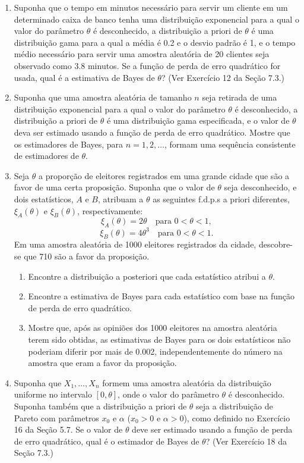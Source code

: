 \begin{enumerate}
    \item Suponha que o tempo em minutos necessário para servir um cliente em um determinado caixa de banco tenha uma distribuição exponencial para a qual o valor do parâmetro $\theta$ é desconhecido, a distribuição a priori de $\theta$ é uma distribuição gama para a qual a média é 0.2 e o desvio padrão é 1, e o tempo médio necessário para servir uma amostra aleatória de 20 clientes seja observado como 3.8 minutos. Se a função de perda de erro quadrático for usada, qual é a estimativa de Bayes de $\theta$? (Ver Exercício 12 da Seção 7.3.)
    
    \item Suponha que uma amostra aleatória de tamanho $n$ seja retirada de uma distribuição exponencial para a qual o valor do parâmetro $\theta$ é desconhecido, a distribuição a priori de $\theta$ é uma distribuição gama especificada, e o valor de $\theta$ deva ser estimado usando a função de perda de erro quadrático. Mostre que os estimadores de Bayes, para $n=1, 2, \dots$, formam uma sequência consistente de estimadores de $\theta$.
    
    \item Seja $\theta$ a proporção de eleitores registrados em uma grande cidade que são a favor de uma certa proposição. Suponha que o valor de $\theta$ seja desconhecido, e dois estatísticos, $A$ e $B$, atribuam a $\theta$ as seguintes f.d.p.s a priori diferentes, $\xi_A(\theta)$ e $\xi_B(\theta)$, respectivamente:
    $$ \xi_A(\theta) = 2\theta \quad \text{para } 0 < \theta < 1, $$
    $$ \xi_B(\theta) = 4\theta^3 \quad \text{para } 0 < \theta < 1. $$
    Em uma amostra aleatória de 1000 eleitores registrados da cidade, descobre-se que 710 são a favor da proposição.
    \begin{enumerate}[label=(\alph*)]
        \item Encontre a distribuição a posteriori que cada estatístico atribui a $\theta$.
        \item Encontre a estimativa de Bayes para cada estatístico com base na função de perda de erro quadrático.
        \item Mostre que, após as opiniões dos 1000 eleitores na amostra aleatória terem sido obtidas, as estimativas de Bayes para os dois estatísticos não poderiam diferir por mais de 0.002, independentemente do número na amostra que eram a favor da proposição.
    \end{enumerate}
    
    \item Suponha que $X_1, \dots, X_n$ formem uma amostra aleatória da distribuição uniforme no intervalo $[0, \theta]$, onde o valor do parâmetro $\theta$ é desconhecido. Suponha também que a distribuição a priori de $\theta$ seja a distribuição de Pareto com parâmetros $x_0$ e $\alpha$ ($x_0>0$ e $\alpha>0$), como definido no Exercício 16 da Seção 5.7. Se o valor de $\theta$ deve ser estimado usando a função de perda de erro quadrático, qual é o estimador de Bayes de $\theta$? (Ver Exercício 18 da Seção 7.3.)
    

\end{enumerate}
